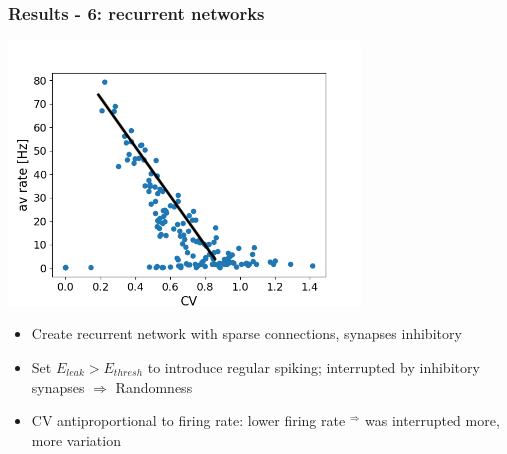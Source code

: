 \documentclass{beamer}
\begin{document}
\begin{frame}
	\frametitle{Results - 6: recurrent networks}
	\centering
	\includegraphics[width=0.7\textwidth]{figures/rate_CV.png}


	\begin{itemize}
		\item Create recurrent network with sparse connections, synapses inhibitory
		\item Set $E_{leak} > E_{thresh}$ to introduce regular spiking; interrupted 
		by inhibitory synapses $\Rightarrow$ Randomness
		\item CV antiproportional to firing rate: lower firing rate $^\Rightarrow$ was 
		interrupted more,  more variation
	\end{itemize}
	
\end{frame}
\end{document}
